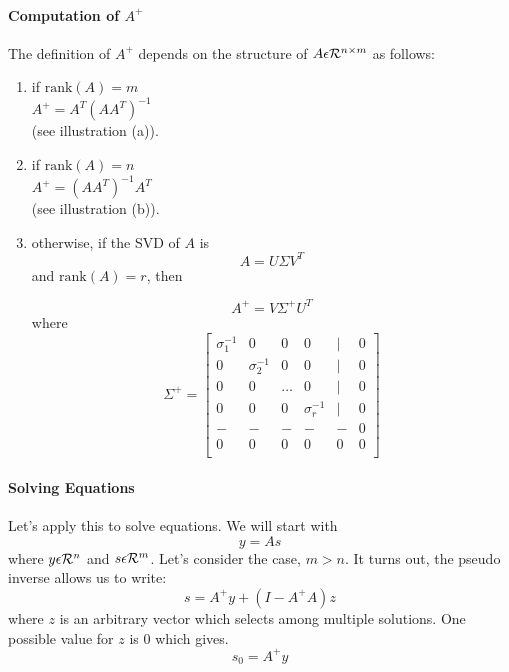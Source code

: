 \paragraph{Computation of $A^+$}

The definition of $A^{+}$ depends on the structure of $A \epsilon \mathcal{R}^{n \times m}$ as follows:
\begin{enumerate}

    \item if $\mathrm{rank}(A) = m$ \\
    $A^{+} = A^T(AA^T)^{-1}$ \\
    (see illustration (a)).

    \item if $\mathrm{rank}(A) = n$ \\
        $A^{+} = (AA^T)^{-1}A^T$ \\
    (see illustration (b)).

    \item otherwise, if the SVD of $A$ is  \\
\[
A = U \Sigma V^T
\]
    and $\mathrm{rank}(A) = r$, then

\[
A^{+} = V \Sigma^{+} U^T
\]
where
\[
\Sigma^+ =  \left [
\begin{array}{cccccc}
\sigma_1^{-1}          & 0 & 0 & 0 & | & 0\\
0 & \sigma_2^{-1}          & 0 & 0 & | & 0\\
0 & 0 & \dots                  & 0 & | & 0\\
0 & 0 & 0 & \sigma_r^{-1}          & | & 0\\
- & - & - & - & -                      & 0\\
0 & 0 & 0 & 0 & 0                      & 0\\
\end{array}
\right ]
\]

\end{enumerate}



\paragraph{Solving Equations}

Let's apply this to solve equations.  We will start with
\begin{equation}
y = As
\end{equation}
where $y \epsilon \mathcal{R}^n$ and $s \epsilon \mathcal{R}^m$.   Let's consider the case, $m>n$.  It turns
out, the pseudo inverse allows us to write:
\begin{equation}\label{MPSoln}
s = A^{+}y + (I-A^{+}A)z
\end{equation}
where $z$ is an arbitrary vector which selects among multiple
solutions. One possible value for $z$ is 0 which gives.
\[
s_0 = A^{+}y
\]

